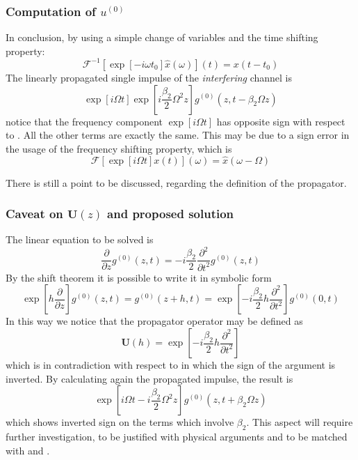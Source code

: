 \documentclass[8pt]{beamer} %
\begin{document}
\begin{frame}
    \frametitle{Computation of $u^{(0)}$}
    In conclusion, by using a simple change of variables and the time shifting property:
    \begin{equation}
        \mathcal{F}^{-1}\left[\exp[-i\omega t_0] \hat{x}(\omega)\right](t) = x(t-t_0)
    \end{equation}
    The linearly propagated single impulse of the \textit{interfering} channel is
    \begin{equation}
        \exp \left[i\Omega t\right] \exp \left[i \frac{\beta_2}{2}\Omega^2 z \right] g^{(0)}(z, t - \beta_2\Omega z)
    \end{equation}
    notice that the frequency component $\exp[i \Omega t]$ has opposite sign with respect to \cite{Dar_2013}. All the other terms are exactly the same.
    This may be due to a sign error in the usage of the frequency shifting property, which is
    \begin{equation}
        \mathcal{F}\left[\exp[i \Omega t] x(t)\right](\omega) = \hat{x}(\omega - \Omega)
    \end{equation}

    \vspace{20pt}
    There is still a point to be discussed, regarding the definition of the propagator.
\end{frame}

\begin{frame}
    \frametitle{Caveat on $\mathbf{U}(z)$ and proposed solution}
    The linear equation to be solved is
    \begin{equation}
        \frac{\partial}{\partial z} g^{(0)}(z, t) = - i \frac{\beta_2}{2}\frac{\partial^2}{\partial t^2} g^{(0)}(z, t)
    \end{equation}
    By the shift theorem \cite{Wiener_1926} it is possible to write it in symbolic form
    \begin{equation}
        \exp\left[h \frac{\partial}{\partial z}\right] g^{(0)}(z, t) = g^{(0)}(z+h, t) = \exp\left[- i \frac{\beta_2}{2}h\frac{\partial^2}{\partial t^2} \right]  g^{(0)}(0, t)
    \end{equation}
    In this way we notice that the propagator operator may be defined as
    \begin{equation}
        \mathbf{U}(h) = \exp\left[- i \frac{\beta_2}{2}h\frac{\partial^2}{\partial t^2} \right]
    \end{equation}
    which is in contradiction with respect to \cite{Dar_2013} in which the sign of the argument is inverted.
    By calculating again the propagated impulse, the result is
    \begin{equation}
        \exp \left[i\Omega t -i \frac{\beta_2}{2}\Omega^2 z \right] g^{(0)}(z, t + \beta_2\Omega z)
    \end{equation}
    which shows inverted sign on the terms which involve $\beta_2$.
    This aspect will require further investigation, to be justified with physical arguments and to be matched with \cite{Dar_2013} and \cite[eq. 23]{Mecozzi_2012}.
\end{frame}
\end{document}
